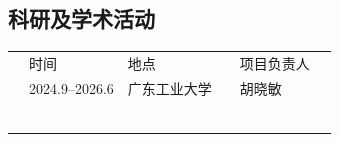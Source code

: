 \pagestyle{empty}
\begin{titlepage} 
    \makeatletter
    \makeatother
\section{科研及学术活动}
\vspace{-18pt}
\begin{center}
\renewcommand{\arraystretch}{1.4}
\begin{tabular}{|C{0.7cm}|C{1.8cm}|C{2.2cm}|C{1.8cm}|C{3cm}|C{3.5cm}|C{2cm}|C{1.5cm}|C{1.5cm}|}
\hline
{}& 时间 & 地点 & & {项目负责人} & \\
& 2024.9--2026.6 & 广东工业大学 && 胡晓敏 &\\
& &  &&&\\
& &  &&&\\
& &  &&&\\
& &  &&&\\
& &  &&&\\
& &  &&&\\


\end{tabular}
\end{center}
\end{titlepage}
